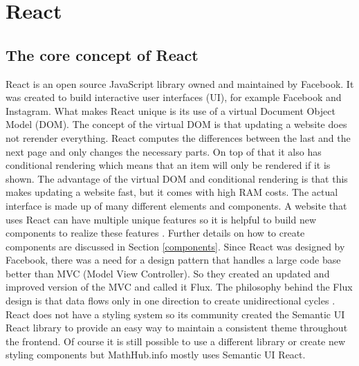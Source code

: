 \documentclass[11pt,a4paper]{article}
\begin{document}
\section{React}\label{react}
\subsection{The core concept of React} 
React is an open source JavaScript library owned and maintained by Facebook.
It was created to build interactive user interfaces (UI), for example Facebook and Instagram.
What makes React unique is its use of a virtual Document Object Model (DOM).
The concept of the virtual DOM is that updating a website does not rerender everything.
React computes the differences between the last and the next page and only changes the necessary parts.
On top of that it also has conditional rendering which means that an item will only be rendered if it is shown.
The advantage of the virtual DOM and conditional rendering is that this makes updating a website fast, but it comes with high RAM costs.
The actual interface is made up of many different elements and components.
A website that uses React can have multiple unique features so it is helpful to build new components to realize these features \cite{reactjs}.
Further details on how to create components are discussed in Section \ref{components}.
\newline \newline
Since React was designed by Facebook, there was a need for a design pattern that handles a large code base better than MVC (Model View Controller).
So they created an updated and improved version of the MVC and called it Flux.
The philosophy behind the Flux design is that data flows only in one direction to create unidirectional cycles \cite{flux}.
\newline \newline
React does not have a styling system so its community created the Semantic UI React library to provide an easy way to maintain a consistent theme throughout the frontend.
Of course it is still possible to use a different library or create new styling components but MathHub.info mostly uses Semantic UI React.
\end{document}

